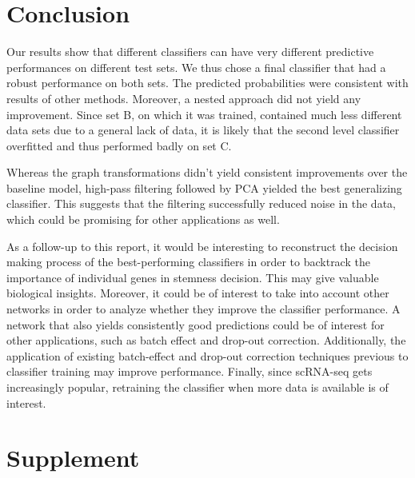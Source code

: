 \documentclass[10pt,conference,compsocconf]{IEEEtran}
\newcommand{\beginsupplement}{%
	\setcounter{table}{0}
	\renewcommand{\thetable}{S\arabic{table}}%
	\setcounter{figure}{0}
	\renewcommand{\thefigure}{S\arabic{figure}}%
}
\begin{document}
\section*{Conclusion}
Our results show that different classifiers can have very different predictive performances on different test sets. We thus chose a final classifier that had a robust performance on both sets. The predicted probabilities were consistent with results of other methods. Moreover, a nested approach did not yield any improvement. Since set B, on which it was trained, contained much less different data sets due to a general lack of data, it is likely that the second level classifier overfitted and thus performed badly on set C. 
\par
Whereas the graph transformations didn't yield consistent improvements over the baseline model, high-pass filtering followed by PCA yielded the best generalizing classifier. This suggests that the filtering successfully reduced noise in the data, which could be promising for other applications as well. 
\par
As a follow-up to this report, it would be interesting to reconstruct the decision making process of the best-performing classifiers in order to backtrack the importance of individual genes in stemness decision. This may give valuable biological insights. Moreover, it could be of interest to take into account other networks in order to analyze whether they improve the classifier performance. A network that also yields consistently good predictions could be of interest for other applications, such as batch effect and drop-out correction\cite{vanDijk2017}. Additionally, the application of existing batch-effect and drop-out correction techniques previous to classifier training may improve performance. Finally, since scRNA-seq gets increasingly popular, retraining the classifier when more data is available is of interest. 





\beginsupplement
\section*{Supplement}
\setcounter{subsection}{0}
\end{document}
